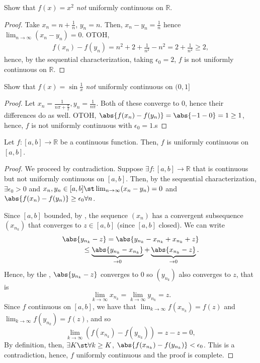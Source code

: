 \documentclass[12pt]{article}
\begin{document}
\begin{example}[$f(x) = x^2$]
  Show that $f(x) = x^2$ \emph{not} uniformly continuous on $\mathbb{R}$.
  \begin{proof}
    Take $x_n = n + \frac{1}{n}$, $y_n = n$. Then, $x_n - y_n = \frac{1}{n}$ hence $\lim_{n\to\infty} (x_n - y_n) = 0$. OTOH, \begin{align*}
      f(x_n) - f(y_n) = n^2 + 2 + \frac{1}{n^2} - n^2 = 2 + \frac{1}{n^2} \geq 2,
    \end{align*}
    hence, by the sequential characterization, taking $\epsilon_0 = 2$, $f$ is not uniformly continuous on $\mathbb{R}$.
  \end{proof}
\end{example}

\begin{example}[$f(x) = \sin \frac{1}{x}$]
  Show that $f(x) = \sin \frac{1}{x}$ \emph{not} uniformly continuous on $(0, 1]$
  \begin{proof}
    Let $x_n = \frac{1}{n\pi + \frac{\pi}{2}}, y_n = \frac{1}{n\pi}$. Both of these converge to $0$, hence their differences do as well. OTOH, $\abs{f(x_n) - f(y_n)} = \abs{-1 - 0} = 1 \geq 1$, hence, $f$ is not uniformly continuous with $\epsilon_0 = 1$.s
  \end{proof}
\end{example}

\begin{theorem}\label{thm:closedanduniform}
  Let $f: [a, b] \to \mathbb{R}$ be a continuous function. Then, $f$ is uniformly continuous on $[a,b]$.
\end{theorem}

\begin{proof}
  We proceed by contradiction. Suppose $\exists f: [a, b] \to \mathbb{R}$ that is continuous but not uniformly continuous on $[a,b]$. Then, by the sequential characterization, $\exists \epsilon_0 > 0$ and $x_n, y_n \in [a, b] \st \lim_{n\to\infty} (x_n - y_n) = 0$ and $\abs{f(x_n) - f(y_n)} \geq \epsilon_0 \forall n$. 

  Since $[a,b]$ bounded, by , the sequence $(x_n)$ has a convergent subsequence $(x_{n_k})$ that converges to $z \in [a, b]$ (since $[a,b]$ closed). We can write \begin{align*}
    \abs{y_{n_k} - z} = \abs{y_{n_k} - x_{n_k} + x_{n_k} + z}\\
    \leq \underbrace{\abs{y_{n_k} - x_{n_k}}}_{\to 0} + \underbrace{\abs{x_{n_k} - z}}_{\to 0}.
  \end{align*}
  Hence, by the , $\abs{y_{n_k} -z}$ converges to 0 so $(y_{n_k})$ also converges to $z$, that is \[
  \lim_{k\to\infty} x_{n_k} = \lim_{k\to\infty} y_{n_k} = z.  
  \]
  Since $f$ continuous on $[a,b]$, we have that $\lim_{k\to\infty} f(x_{n_k}) = f(z)$ and $\lim_{k\to\infty} f(y_{n_k}) = f(z)$, and so \[
  \lim_{k\to\infty} (f(x_{n_k}) - f(y_{n_k}))  = z - z = 0,
  \]
  By definition, then, $\exists K \st \forall k \geq K$, $\abs{f(x_{n_k}) - f(y_{n_k})} < \epsilon_0$. This is a contradiction, hence, $f$ uniformly continuous and the proof is complete.
\end{proof}
\end{document}
